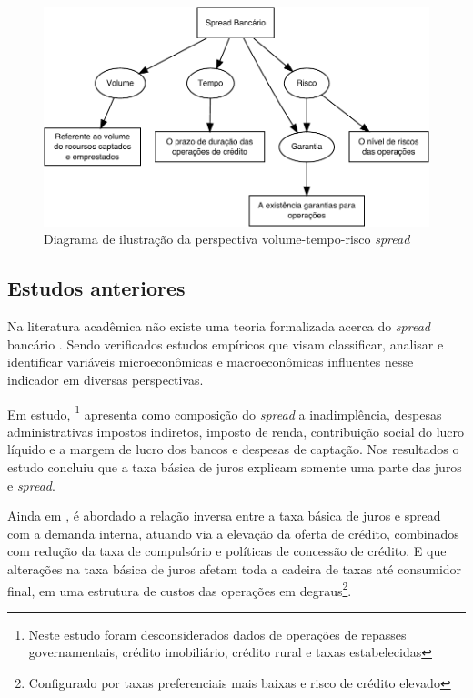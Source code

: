 \documentclass[
  12pt,
  12pt,
  openright,
  oneside,
  a4paper,
  chapter=TITLE,
  section=TITLE,
  subsection=TITLE,
  subsubsection=TITLE,
  english,
  portugues,
  sumario=tradicional]{abntex2}
\begin{document}
\begin{figure}[!htbp]
\vspace{20pt}
\caption{Diagrama de ilustração da perspectiva volume-tempo-risco  \emph{spread}}
\vspace{-4mm}

\begin{center}\includegraphics{12-exportedfigures/diagram.spread.vol.tem,ris-1} \end{center}
\vspace{-3mm}
\label{fig:diagramd}
\vspace{-2mm}
\end{figure}

\subsection{Estudos anteriores}

Na literatura acadêmica não existe uma teoria formalizada acerca do \emph{spread} bancário \cite{timotio:2018}. Sendo verificados estudos empíricos que visam classificar, analisar e identificar variáveis microeconômicas e macroeconômicas influentes nesse indicador em diversas perspectivas.

Em estudo, \textcite{BCB:1999}\footnote{Neste estudo foram desconsiderados dados de operações de repasses governamentais, crédito imobiliário, crédito rural e taxas estabelecidas} apresenta como composição do \emph{spread} a inadimplência, despesas administrativas impostos indiretos, imposto de renda, contribuição social do lucro líquido e a margem de lucro dos bancos e despesas de captação. Nos resultados o estudo concluiu que a taxa básica de juros explicam somente uma parte das juros e \emph{spread}.

Ainda em \textcite{BCB:1999}, é abordado a relação inversa entre a taxa básica de juros e spread com a demanda interna, atuando via a elevação da oferta de crédito, combinados com redução da taxa de compulsório e políticas de concessão de crédito. E que alterações na taxa básica de juros afetam toda a cadeira de taxas até consumidor final, em uma estrutura de custos das operações em degraus\footnote{Configurado por taxas preferenciais mais baixas e risco de crédito elevado}.
\end{document}
